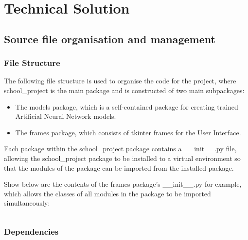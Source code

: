 \documentclass[./project-report/src/latex/project-report.tex]{subfiles}
\begin{document}
\maketitle

\clearpage
\section{Technical Solution}

\subsection{Source file organisation and management }

\subsubsection{File Structure}

The following file structure is used to organise the code for the project, where school\_project is the main package and is constructed of two main subpackages:

\begin{itemize}
    \item The models package, which is a self-contained package for creating trained Artificial Neural Network models.
    \item The frames package, which consists of tkinter frames for the User Interface.
\end{itemize}

\pagebreak

\begin{footnotesize}

\end{footnotesize}

\pagebreak

Each package within the school\_project package contains a \_\_init\_\_.py file, allowing the school\_project package to be installed to a virtual environment 
so that the modules of the package can be imported from the installed package.

Show below are the contents of the frames package's \_\_init\_\_.py for example, which allows the classes of all modules in the package to be imported simultaneously:

\inputminted{python}{./school_project/frames/__init__.py}

\subsubsection{Dependencies}
\end{document}
